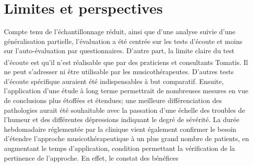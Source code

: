 \section{Limites et perspectives}
Compte tenu  de l'échantillonnage réduit, ainsi que d'une analyse
suivie d'une généralisation partielle, l'évaluation a été centrée sur les
tests d'écoute et moins sur
l'auto-évaluation par questionnaires.
D'autre part, la limite claire du test d'écoute est qu'il n'est réalisable que par des praticiens et 
consultants 
Tomatis\textsuperscript \textregistered.
Il ne peut s'adresser ni être utilisable par les musicothérapeutes. 	D'autres tests d'écoute spécifique 
auraient été indispensables à but
comparatif.
Ensuite, l'application d'une étude à long terme permettrait  de nombreuses
mesures en vue de conclusions plus étoffées et étendues;  
une meilleure différenciation des pathologies aurait été souhaitable avec la 
passation d'une échelle des troubles de l'humeur et des différentes
dépressions indiquant le degré de sévérité.
La durée hebdomadaire réglementée par la clinique vient également 
confirmer le besoin d'étendre l'approche musicothérapeutique à
un plus grand nombre de patients, en augmentant le temps
d'application, condition permettant la vérification de la
pertinence de l'approche. En effet, le constat des bénéfices
